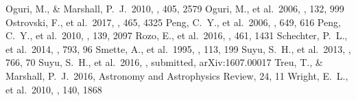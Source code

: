 \documentclass[twocolumn]{aastex6}
\begin{document}
\begin{thebibliography}{}
 Oguri, M., \& Marshall, P.~J.\ 2010, \mnras, 405, 2579
 Oguri, M., et al.\ 2006, \aj, 132, 999
 Ostrovski, F., et al.\ 2017, \mnras, 465, 4325
 Peng, C.~Y., et al.\ 2006, \apj, 649, 616
 Peng, C.~Y., et al.\ 2010, \aj, 139, 2097
 Rozo, E., et al.\ 2016, \mnras, 461, 1431
 Schechter, P.~L., et al.\ 2014, \apj, 793, 96
 Smette, A., et al.\ 1995, \aaps, 113, 199
 Suyu, S.~H., et al.\ 2013, \apj, 766, 70
 Suyu, S.~H., et al.\ 2016, \mnras, submitted, arXiv:1607.00017
 Treu, T., \& Marshall, P.~J.\ 2016, Astronomy and Astrophysics Review, 24, 11
 Wright, E.~L., et al.\ 2010, \aj, 140, 1868


\end{thebibliography}

\end{document}
